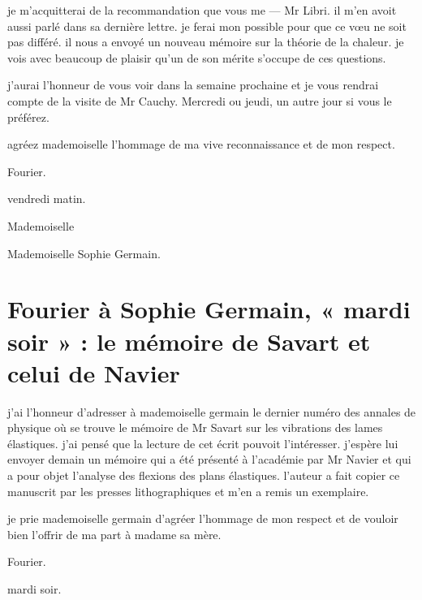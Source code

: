 \documentclass[11pt,a4paper]{article}
\begin{document}
je m'acquitterai de la recommandation que vous me  —
 Mr Libri. il m'en avoit aussi parlé dans sa dernière
lettre. je ferai mon possible pour que ce vœu ne soit pas différé. il nous a
envoyé un nouveau mémoire sur la théorie de la chaleur. je vois avec beaucoup
de plaisir qu'un  de son mérite s'occupe de ces questions.


j'aurai l'honneur de vous voir dans la semaine prochaine et je vous rendrai
compte de la visite de Mr Cauchy. Mercredi ou jeudi, un autre jour si vous le
préférez.

agréez mademoiselle l'hommage de ma vive reconnaissance et de mon respect.

Fourier.

vendredi matin.

Mademoiselle

Mademoiselle Sophie Germain.

\section{Fourier à Sophie Germain, « mardi soir » : le mémoire de Savart et celui de Navier}

j'ai l'honneur d'adresser à mademoiselle germain le dernier numéro des
annales de physique où se trouve le mémoire de Mr Savart sur les vibrations
des lames élastiques. j'ai pensé que la lecture de cet écrit pouvoit
l'intéresser. j'espère lui envoyer demain un mémoire qui a été présenté à
l'académie par Mr Navier et qui a pour objet l'analyse des flexions des plans
élastiques. l'auteur a fait copier ce manuscrit par les presses
lithographiques et m'en a remis un exemplaire.

je prie mademoiselle germain d'agréer l'hommage de mon respect et de vouloir
bien l'offrir de ma part à madame sa mère.

Fourier.

mardi soir.

\end{document}

